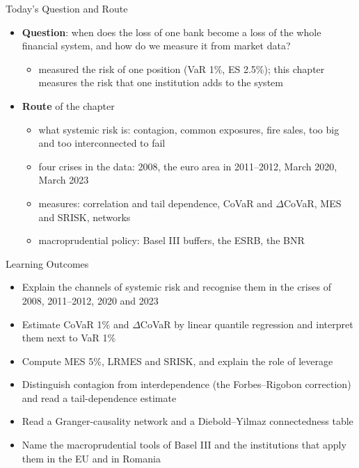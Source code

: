 \begin{frame}{Today's Question and Route}
\itemsize{\small}
\begin{itemize}
    \item \textbf{Question}: when does the loss of one bank become a loss of the whole financial system, and how do we measure it from market data?
    \begin{itemize}
        \item {} measured the risk of one position (VaR 1\%, ES 2.5\%); this chapter measures the risk that one institution adds to the system
    \end{itemize}
    \item \textbf{Route} of the chapter
    \begin{itemize}
        \item what systemic risk is: contagion, common exposures, fire sales, too big and too interconnected to fail
        \item four crises in the data: 2008, the euro area in 2011--2012, March 2020, March 2023
        \item measures: correlation and tail dependence, CoVaR and $\Delta$CoVaR, MES and SRISK, networks
        \item macroprudential policy: Basel III buffers, the ESRB, the BNR
    \end{itemize}
\end{itemize}
\end{frame}

\begin{frame}{Learning Outcomes}
\itemsize{\small}
\begin{itemize}
    \item Explain the channels of systemic risk and recognise them in the crises of 2008, 2011--2012, 2020 and 2023
    \item Estimate CoVaR 1\% and $\Delta$CoVaR by linear quantile regression and interpret them next to VaR 1\%
    \item Compute MES 5\%, LRMES and SRISK, and explain the role of leverage
    \item Distinguish contagion from interdependence (the Forbes--Rigobon correction) and read a tail-dependence estimate
    \item Read a Granger-causality network and a Diebold--Yilmaz connectedness table
    \item Name the macroprudential tools of Basel III and the institutions that apply them in the EU and in Romania
\end{itemize}
\end{frame}

